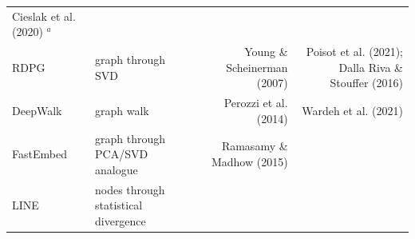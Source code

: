 \documentclass[10pt,oneside]{article}
\begin{document}
\begin{longtable}[]{@{}llrr@{}}
\begin{minipage}[t]{0.32\columnwidth}
Cieslak et al. (2020) \(^a\)\strut
\end{minipage}\tabularnewline
\begin{minipage}[t]{0.11\columnwidth}\raggedright
RDPG\strut
\end{minipage} & \begin{minipage}[t]{0.30\columnwidth}\raggedright
graph through SVD\strut
\end{minipage} & \begin{minipage}[t]{0.16\columnwidth}\raggedleft
Young \& Scheinerman (2007)\strut
\end{minipage} & \begin{minipage}[t]{0.32\columnwidth}\raggedleft
Poisot et al. (2021); Dalla Riva \& Stouffer (2016)\strut
\end{minipage}\tabularnewline
\begin{minipage}[t]{0.11\columnwidth}\raggedright
DeepWalk\strut
\end{minipage} & \begin{minipage}[t]{0.30\columnwidth}\raggedright
graph walk\strut
\end{minipage} & \begin{minipage}[t]{0.16\columnwidth}\raggedleft
Perozzi et al. (2014)\strut
\end{minipage} & \begin{minipage}[t]{0.32\columnwidth}\raggedleft
Wardeh et al. (2021)\strut
\end{minipage}\tabularnewline
\begin{minipage}[t]{0.11\columnwidth}\raggedright
FastEmbed\strut
\end{minipage} & \begin{minipage}[t]{0.30\columnwidth}\raggedright
graph through PCA/SVD analogue\strut
\end{minipage} & \begin{minipage}[t]{0.16\columnwidth}\raggedleft
Ramasamy \& Madhow (2015)\strut
\end{minipage} & \begin{minipage}[t]{0.32\columnwidth}\raggedleft
\strut
\end{minipage}\tabularnewline
\begin{minipage}[t]{0.11\columnwidth}\raggedright
LINE\strut
\end{minipage} & \begin{minipage}[t]{0.30\columnwidth}\raggedright
nodes through statistical divergence\strut
\end{minipage} & \begin{minipage}[t]{0.16\columnwidth}\raggedleft

\end{minipage}
\end{longtable}
\end{document}
